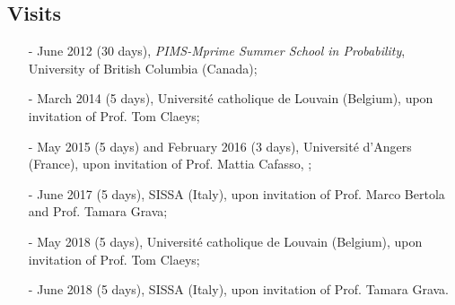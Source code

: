 \documentclass[margin]{res}
\begin{document}
\begin{resume}
  \section{Visits}
 \begin{itemize} \itemsep -2pt  %
\item[-] June 2012 (30 days), \emph{PIMS-Mprime Summer School in Probability}, University of British Columbia (Canada);
\item[-] March 2014 (5 days), Universit\'e catholique de Louvain (Belgium), upon invitation of Prof. Tom Claeys;
\item[-] May 2015 (5 days) and February 2016 (3 days), Universit\'e d'Angers (France), upon invitation of Prof. Mattia Cafasso, ;
\item[-] June 2017 (5 days), SISSA (Italy), upon invitation of Prof. Marco Bertola and Prof. Tamara Grava;  
\item[-] May 2018 (5 days), Universit\'e catholique de Louvain (Belgium), upon invitation of Prof. Tom Claeys;
\item[-] June 2018 (5 days), SISSA (Italy), upon invitation of Prof. Tamara Grava.  \\
 \end{itemize}

 
 

\end{resume}
\end{document}
